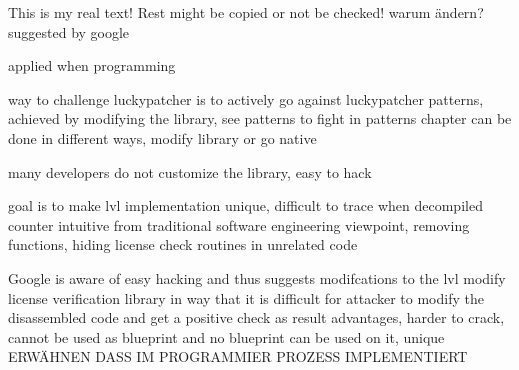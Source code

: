 This is my real text! Rest might be copied or not be checked!
warum ändern?
suggested by google

applied when programming

%
way to challenge luckypatcher is to actively go against luckypatcher patterns, achieved by modifying the library, see patterns to fight in patterns chapter
can be done in different ways, modify library or go native

many developers do not customize the library, easy to hack
\cite{munteanLicense}
%

%
goal is to make lvl implementation unique, difficult to trace when decompiled
counter intuitive from traditional software engineering viewpoint, removing functions, hiding license check routines in unrelated code

Google is aware of easy hacking and thus suggests modifcations to the lvl
modify license verification library in way that it is difficult for attacker to modify the disassembled code and get a positive check as result
advantages, harder to crack, cannot be used as blueprint and no blueprint can be used on it, unique
\cite{developersSecuring}
%
ERWÄHNEN DASS IM PROGRAMMIER PROZESS  IMPLEMENTIERT\newline

